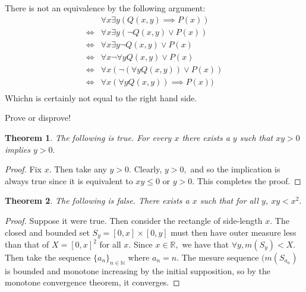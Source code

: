 \documentclass[letter]{article}
\newtheorem{theorem}{Theorem}
\newenvironment{menumerate}{%
  \edef\backupindent{\the\parindent}%
  \enumerate%
  \setlength{\parindent}{\backupindent}%
}{\endenumerate}
\begin{document}
\begin{menumerate}
\begin{menumerate}
        \item There is not an equivalence by the following argument:
          \begin{equation}
            \begin{aligned}
              & \forall x \exists y (Q(x,y) \implies P(x)) \\
              \iff &\forall x \exists y (\neg Q(x,y) \vee P(x)) \\
              \iff &\forall x \exists y \neg Q(x,y) \vee P(x) \\
              \iff &\forall x \neg \forall y Q(x,y) \vee P(x) \\
              \iff &\forall x (\neg (\forall y Q(x,y)) \vee P(x)) \\
              \iff &\forall x (\forall y Q(x,y)) \implies P(x)) \\
            \end{aligned}
          \end{equation}
          Whichn is certainly not equal to the right hand side.
    \end{menumerate}

    \item Prove or disprove!
    \begin{menumerate}
        \item 
        \begin{theorem}
            The following is true. For every $x$ there exists a $y$ such that $xy > 0$ implies $y > 0.$
        \end{theorem}
        \begin{proof}
           Fix $x.$ Then take any $y > 0.$ Clearly, $y >0,$ and so the implication is always true
           since it is equivalent to $xy \leq 0$ or $y > 0.$ This completes the proof.
        \end{proof}
        \item 
        \begin{theorem}
          The following is false. There exists a $x$ such that for all $y$, $xy < x^2.$
        \end{theorem}
        \begin{proof}
          Suppose it were true. Then consider the rectangle of side-length $x.$
          The closed and bounded set $S_y = [0,x]\times[0,y]$ must then have outer measure
          less than that of $X =[0,x]^2$ for all $x.$ Since $x \in \mathbb{R},$
          we have that $\forall y, m(S_y) < X.$ Then take the sequence $\{a_n\}_{n \in \mathbb{N}}$
          where $a_n = n$. The mesure sequence $(m(S_{a_n})$ is bounded and monotone increasing 
          by the initial supposition, so by the monotone convergence theorem, it converges.


\end{proof}
\end{menumerate}
\end{menumerate}
\end{document}
